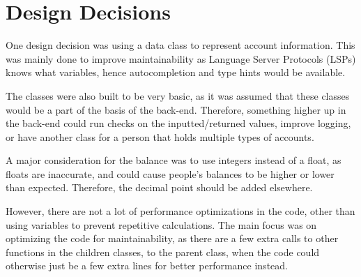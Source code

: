 \documentclass[11pt,british]{article}
\begin{document}
\section*{Design Decisions}

One design decision was using a data class to represent account information.
This was mainly done to improve maintainability as Language Server Protocols (LSPs)
knows what variables, hence autocompletion and type hints would be available.

The classes were also built to be very basic, as it was assumed that
these classes would be a part of the basis of the back-end.
Therefore, something higher up in the back-end could run checks on the inputted\slash returned
values, improve logging, or have another class for a person that holds multiple
types of accounts.

A major consideration for the balance was to use integers instead of a float,
as floats are inaccurate, and could cause people's balances to be higher or
lower than expected. Therefore, the decimal point should be added elsewhere.

However, there are not a lot of performance optimizations in the code, other than
using variables to prevent repetitive calculations. The main focus was on optimizing
the code for maintainability, as there are a few extra calls to other functions in
the children classes, to the parent class, when the code could otherwise just be a few extra lines
for better performance instead.
\end{document}
